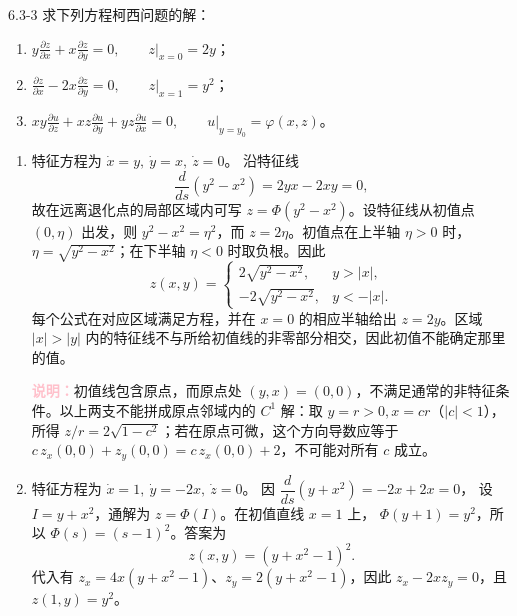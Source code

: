 \documentclass[UTF8,a4paper,11pt]{ctexart}
\newcommand{\note}[1]{\par\smallskip\noindent\textcolor{pink}{\bfseries 说明：}#1\par\smallskip}
\begin{document}
\begin{problem}{6.3-3}
求下列方程柯西问题的解：
\begin{enumerate}[label=(\arabic*)]
\item $\displaystyle
y\frac{\partial z}{\partial x}
+x\frac{\partial z}{\partial y}=0,
\qquad \left.z\right|_{x=0}=2y$；
\item $\displaystyle
\frac{\partial z}{\partial x}
-2x\frac{\partial z}{\partial y}=0,
\qquad \left.z\right|_{x=1}=y^2$；
\item $\displaystyle
xy\frac{\partial u}{\partial z}
+xz\frac{\partial u}{\partial y}
+yz\frac{\partial u}{\partial x}=0,
\qquad \left.u\right|_{y=y_0}=\varphi(x,z)$。
\end{enumerate}
\end{problem}
\begin{solution}
\begin{enumerate}[label=(\arabic*)]
\item 特征方程为
$\dot x=y,\ \dot y=x,\ \dot z=0$。
沿特征线
\[
\frac{d}{ds}(y^2-x^2)=2yx-2xy=0,
\]
故在远离退化点的局部区域内可写
$z=\Phi(y^2-x^2)$。设特征线从初值点 $(0,\eta)$ 出发，则
$y^2-x^2=\eta^2$，而 $z=2\eta$。初值点在上半轴 $\eta>0$ 时，
$\eta=\sqrt{y^2-x^2}$；在下半轴 $\eta<0$ 时取负根。因此
\[
\boxed{
z(x,y)=
\begin{cases}
2\sqrt{y^2-x^2},&y>|x|,\\[2pt]
-2\sqrt{y^2-x^2},&y<-|x|.
\end{cases}}
\]
每个公式在对应区域满足方程，并在 $x=0$ 的相应半轴给出 $z=2y$。区域 $|x|>|y|$ 内的特征线不与所给初值线的非零部分相交，因此初值不能确定那里的值。
\note{初值线包含原点，而原点处 $(y,x)=(0,0)$，不满足通常的非特征条件。以上两支不能拼成原点邻域内的 $C^1$ 解：取 $y=r>0,x=cr$（$|c|<1$），所得 $z/r=2\sqrt{1-c^2}$；若在原点可微，这个方向导数应等于 $c\,z_x(0,0)+z_y(0,0)=c\,z_x(0,0)+2$，不可能对所有 $c$ 成立。}

\item 特征方程为
$\dot x=1,\ \dot y=-2x,\ \dot z=0$。
因
$\dfrac{d}{ds}(y+x^2)=-2x+2x=0$，
设 $I=y+x^2$，通解为 $z=\Phi(I)$。在初值直线 $x=1$ 上，
$\Phi(y+1)=y^2$，所以 $\Phi(s)=(s-1)^2$。答案为
\[
\boxed{z(x,y)=(y+x^2-1)^2.}
\]
代入有 $z_x=4x(y+x^2-1)$、$z_y=2(y+x^2-1)$，因此
$z_x-2xz_y=0$，且 $z(1,y)=y^2$。


\end{enumerate}
\end{solution}
\end{document}
